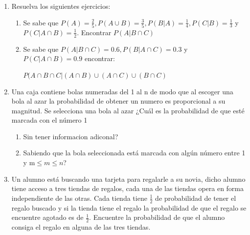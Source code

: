 \documentclass[12pt,a4paper]{report}
\begin{document}
\begin{enumerate}
  \item{
 Resuelva los siguientes ejercicios:\\
 \begin{enumerate}[label=\alph*) ]
 \item{Se sabe que $P(A)= \frac{2}{5},P(A\cup B)=\frac{3}{5},P(B|A)=\frac{1}{4},P(C|B)=\frac{1}{3}$ y $P(C|A\cap B)=\frac{1}{2}$. Encontrar $P(A|B\cap C)$}\\
 \item{Se sabe que $P(A|B\cap C)=0.6, P(B|A\cap C)=0.3$ y $P(C|A\cap B)=0.9$ encontrar: \\ 
 \begin{center}
 $P(A\cap B\cap C| (A\cap B) \cup (A\cap C) \cup (B\cap C)$
 \end{center} }
 \end{enumerate}
  }


  \item{
 Una caja contiene bolas numeradas del 1 al n de modo que al escoger una bola al azar la probabilidad de obtener un numero es proporcional a su magnitud. Se selecciona una bola al azar ¿Cuál es la probabilidad de que esté marcada con el número 1\\
 \begin{enumerate}[label= \alph*) ]
 \item{Sin tener informacion adiconal?}\\
 \item{Sabiendo que la bola seleccionada está marcada con algún número entre 1 y m$\leq m \leq n$?}
 \end{enumerate}
  }

  \item{
Un alumno está buscando una tarjeta para regalarle a su novia, dicho alumno tiene acceso a tres tiendas de regalos, cada una de las tiendas opera en forma independiente de las otras. Cada tienda tiene $\frac{1}{2}$ de probabilidad de tener el regalo buscado y si la tienda tiene el regalo la probabilidad de que el regalo se encuentre agotado es de $\frac{1}{2}$. Encuentre la probabilidad de que el alumno consiga el regalo en alguna de las tres tiendas.
  }






\end{enumerate}
\end{document}
